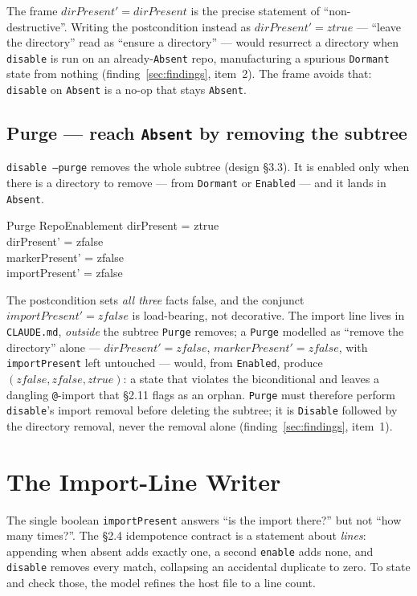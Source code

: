 \documentclass[a4paper,10pt,fleqn]{article}
\begin{document}
The frame $dirPresent' = dirPresent$ is the precise statement of
``non-destructive''. Writing the postcondition instead as $dirPresent' = ztrue$
--- ``leave the directory'' read as ``ensure a directory'' --- would resurrect a
directory when \texttt{disable} is run on an already-\texttt{Absent} repo,
manufacturing a spurious \texttt{Dormant} state from nothing
(finding~\ref{sec:findings}, item~2). The frame avoids that: \texttt{disable} on
\texttt{Absent} is a no-op that stays \texttt{Absent}.

\subsection{Purge --- reach \texttt{Absent} by removing the subtree}

\texttt{disable --purge} removes the whole subtree (design \S3.3). It is enabled
only when there is a directory to remove --- from \texttt{Dormant} or
\texttt{Enabled} --- and it lands in \texttt{Absent}.

\begin{schema}{Purge}
  \Delta RepoEnablement
  \where
  dirPresent = ztrue \\
  dirPresent' = zfalse \\
  markerPresent' = zfalse \\
  importPresent' = zfalse
\end{schema}

The postcondition sets \emph{all three} facts false, and the conjunct
$importPresent' = zfalse$ is load-bearing, not decorative. The import line lives
in \texttt{CLAUDE.md}, \emph{outside} the subtree \texttt{Purge} removes; a
\texttt{Purge} modelled as ``remove the directory'' alone --- $dirPresent' =
zfalse$, $markerPresent' = zfalse$, with \texttt{importPresent} left untouched
--- would, from \texttt{Enabled}, produce $(zfalse, zfalse, ztrue)$: a state
that violates the biconditional and leaves a dangling \texttt{@}-import that
\S2.11 flags as an orphan. \texttt{Purge} must therefore perform
\texttt{disable}'s import removal before deleting the subtree; it is
\texttt{Disable} followed by the directory removal, never the removal alone
(finding~\ref{sec:findings}, item~1).

\section{The Import-Line Writer}
\label{sec:writer}

The single boolean \texttt{importPresent} answers ``is the import there?'' but
not ``how many times?''. The \S2.4 idempotence contract is a statement about
\emph{lines}: appending when absent adds exactly one, a second \texttt{enable}
adds none, and \texttt{disable} removes every match, collapsing an accidental
duplicate to zero. To state and check those, the model refines the host file to
a line count.
\end{document}
